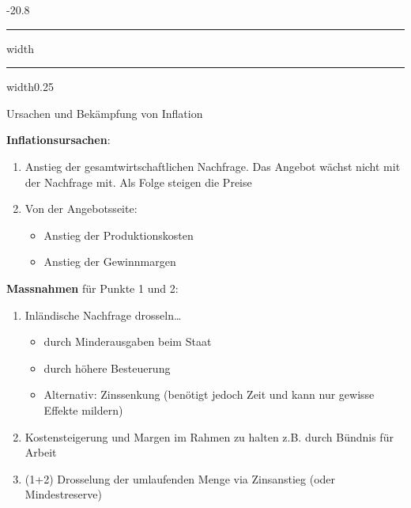 \documentclass[9pt, landscape, fleqn]{scrartcl}
\makeatletter
\renewcommand{\subsection}{\@startsection{subsection}{1}{0mm}%
{-2\baselineskip}{0.8\baselineskip}%
{\hrule depth 0.2pt width\columnwidth\hrule depth0.75pt
width0.25\columnwidth\vspace*{1.2em}\large\bfseries\rmfamily}}
\makeatother
\begin{document}
\begin{multicols*}{3}
\subsection{Ursachen und Bekämpfung von Inflation}

\textbf{Inflationsursachen}:

\begin{enumerate}
    \item Anstieg der gesamtwirtschaftlichen Nachfrage. Das Angebot wächst nicht mit der Nachfrage mit. Als Folge steigen die Preise 
    \item Von der Angebotsseite: 
    \begin{itemize}
        \item Anstieg der Produktionskosten 
        \item Anstieg der Gewinnmargen 
    \end{itemize}
\end{enumerate}

\textbf{Massnahmen} für Punkte 1 und 2:

\begin{enumerate}
    \item Inländische Nachfrage drosseln\dots
    \begin{itemize}
        \item durch Minderausgaben beim Staat
        \item durch höhere Besteuerung 
        \item Alternativ: Zinssenkung (benötigt jedoch Zeit und kann nur gewisse Effekte mildern)
    \end{itemize}
    \item Kostensteigerung und Margen im Rahmen zu halten z.B. durch Bündnis für Arbeit 
    \item (1+2) Drosselung der umlaufenden Menge via Zinsanstieg (oder Mindestreserve)
\end{enumerate}


\end{multicols*}
\end{document}
